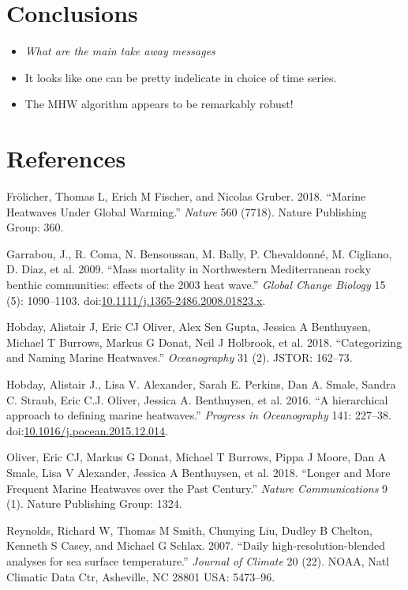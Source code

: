 \documentclass[]{article}
\begin{document}
\section{Conclusions}\label{conclusions}

\begin{itemize}
\item
  \emph{What are the main take away messages}
\item
  It looks like one can be pretty indelicate in choice of time series.
\item
  The MHW algorithm appears to be remarkably robust!
\end{itemize}

\section*{References}\label{references}

\hypertarget{refs}{}
\hypertarget{ref-Frolicher2018}{}
Frölicher, Thomas L, Erich M Fischer, and Nicolas Gruber. 2018. ``Marine
Heatwaves Under Global Warming.'' \emph{Nature} 560 (7718). Nature
Publishing Group: 360.

\hypertarget{ref-Garrabou2009}{}
Garrabou, J., R. Coma, N. Bensoussan, M. Bally, P. Chevaldonné, M.
Cigliano, D. Diaz, et al. 2009. ``Mass mortality in Northwestern
Mediterranean rocky benthic communities: effects of the 2003 heat
wave.'' \emph{Global Change Biology} 15 (5): 1090--1103.
doi:\href{https://doi.org/10.1111/j.1365-2486.2008.01823.x}{10.1111/j.1365-2486.2008.01823.x}.

\hypertarget{ref-Hobday2018}{}
Hobday, Alistair J, Eric CJ Oliver, Alex Sen Gupta, Jessica A
Benthuysen, Michael T Burrows, Markus G Donat, Neil J Holbrook, et al.
2018. ``Categorizing and Naming Marine Heatwaves.'' \emph{Oceanography}
31 (2). JSTOR: 162--73.

\hypertarget{ref-Hobday2016}{}
Hobday, Alistair J., Lisa V. Alexander, Sarah E. Perkins, Dan A. Smale,
Sandra C. Straub, Eric C.J. Oliver, Jessica A. Benthuysen, et al. 2016.
``A hierarchical approach to defining marine heatwaves.'' \emph{Progress
in Oceanography} 141: 227--38.
doi:\href{https://doi.org/10.1016/j.pocean.2015.12.014}{10.1016/j.pocean.2015.12.014}.

\hypertarget{ref-Oliver2018}{}
Oliver, Eric CJ, Markus G Donat, Michael T Burrows, Pippa J Moore, Dan A
Smale, Lisa V Alexander, Jessica A Benthuysen, et al. 2018. ``Longer and
More Frequent Marine Heatwaves over the Past Century.'' \emph{Nature
Communications} 9 (1). Nature Publishing Group: 1324.

\hypertarget{ref-Reynolds2007}{}
Reynolds, Richard W, Thomas M Smith, Chunying Liu, Dudley B Chelton,
Kenneth S Casey, and Michael G Schlax. 2007. ``Daily
high-resolution-blended analyses for sea surface temperature.''
\emph{Journal of Climate} 20 (22). NOAA, Natl Climatic Data Ctr,
Asheville, NC 28801 USA: 5473--96.
\end{document}
